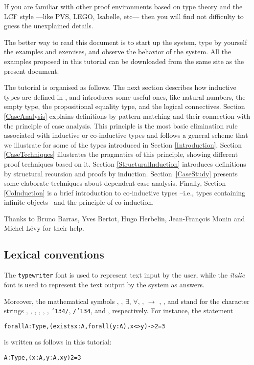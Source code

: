 \documentclass[11pt]{article}
\begin{document}
If you are familiar with other proof environments
based on type theory and the LCF style ---like PVS, LEGO, Isabelle,
etc--- then you will find not difficulty to guess the unexplained
details.

The better way to read this document is to start up the {\coq} system,
type by yourself the examples and exercises, and observe the
behavior of the system. All the examples proposed in this tutorial
can be downloaded from the same site as the present document. 


The tutorial is organised as follows. The next section describes how
inductive types are defined in {\coq}, and introduces some useful ones,
like natural numbers, the empty type, the propositional equality type,
and the logical connectives. Section \ref{CaseAnalysis} explains
definitions by pattern-matching and their connection with the
principle of case analysis. This principle is the most basic
elimination rule associated with inductive or co-inductive types
 and follows a
general scheme that we illustrate for some of the types introduced in
Section \ref{Introduction}.  Section \ref{CaseTechniques} illustrates
the pragmatics of this principle, showing different proof techniques
based on it. Section \ref{StructuralInduction} introduces definitions
by structural recursion and proofs by induction. 
Section~\ref{CaseStudy} presents some elaborate techniques
about dependent case analysis. Finally, Section
\ref{CoInduction} is a brief introduction to co-inductive types
--i.e., types containing infinite objects-- and the principle of
co-induction.


Thanks to  Bruno Barras, Yves Bertot, Hugo Herbelin, Jean-Fran\c{c}ois Monin
and Michel L\'evy for their help.

\subsection*{Lexical conventions}
The \texttt{typewriter} font is used to represent text
input by the user, while the \textit{italic} font is used to represent
the text output by the system as answers.  


Moreover, the mathematical symbols \coqle{}, \coqdiff, \(\exists\),
\(\forall\), \arrow{}, $\rightarrow{}$ \coqor{}, \coqand{}, and \funarrow{} 
stand for the character strings \citecoq{<=}, \citecoq{<>},
, , \citecoq{->}, \citecoq{<-},
\texttt{\char'134/}, \texttt{/\char'134}, and \citecoq{=>},
respectively.  For instance, the \coq{} statement
\begin{alltt}
forall A:Type,(exists x : A, forall (y:A), x <> y) -> 2 = 3
\end{alltt}
is written as follows in this tutorial:
\begin{alltt}
A:Type,(\exsym{}x:A, {\prodsym}y:A, x {\coqdiff} y) \arrow{} 2 = 3
\end{alltt}
\end{document}
